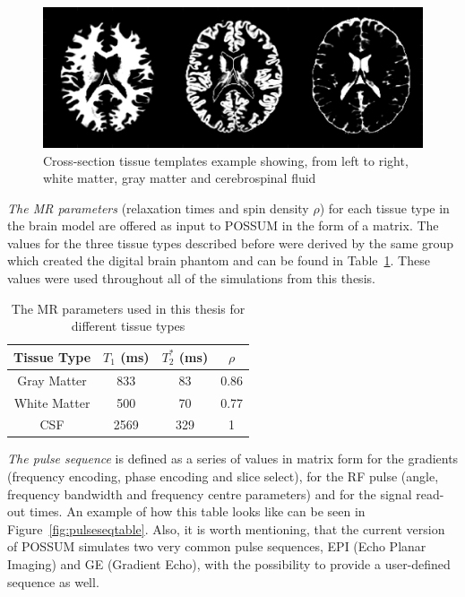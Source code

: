 \begin{figure}[H]
    \centering
    \includegraphics[width=.7\textwidth,keepaspectratio]{tissuetemp}
    \caption{Cross-section tissue templates example showing, from left to right, white matter, gray matter and cerebrospinal fluid}
    \label{fig:tissuetemp}
\end{figure}

\textit{The MR parameters} (relaxation times and spin density $\rho$) for each tissue type in the brain model are offered as input to POSSUM in the form of a matrix. The values for the three tissue types described before were derived by the same group which created the digital brain phantom and can be found in Table~\ref{tab:mrparams}. These values were used throughout all of the simulations from this thesis.

\begin{table}[h!]
\centering
\begin{tabular}{||c c c c ||} 
 \hline
 Tissue Type & $T_1$ (ms) & $T_2^*$ (ms) & $\rho$   \\ [0.5ex] 
 \hline\hline
 Gray Matter & 833 & 83 & 0.86   \\ 
 White Matter  & 500 & 70 & 0.77   \\
 CSF  & 2569 & 329 & 1 \\
 \hline
\end{tabular}
\caption{The MR parameters used in this thesis for different tissue types}
\label{tab:mrparams}
\end{table}

\textit{The pulse sequence} is defined as a series of values in matrix form for the gradients (frequency encoding, phase encoding and slice select), for the RF pulse (angle, frequency bandwidth and frequency centre parameters) and for the signal read-out times. An example of how this table looks like can be seen in Figure~\ref{fig:pulseseqtable}. Also, it is worth mentioning, that the current version of POSSUM simulates two very common pulse sequences, EPI (Echo Planar Imaging) and GE (Gradient Echo), with the possibility to provide a user-defined sequence as well.

